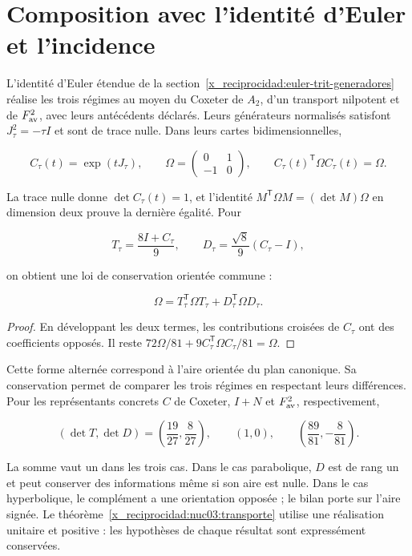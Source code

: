 \section{Composition avec l’identité d’Euler et l’incidence}

L’identité d’Euler étendue de la section~\ref{x_reciprocidad:euler-trit-generadores} réalise les trois régimes au moyen du Coxeter de \(A_2\), d’un transport nilpotent et de \(F_{\rm av}^2\), avec leurs antécédents déclarés. Leurs générateurs normalisés satisfont \(J_\tau^2=-\tau I\) et sont de trace nulle. Dans leurs cartes bidimensionnelles,


\[
C_\tau(t)=\exp(tJ_\tau),\qquad
\Omega=\begin{pmatrix}0&1\\-1&0\end{pmatrix},\qquad
C_\tau(t)^\mathsf T\Omega C_\tau(t)=\Omega.
\]

La trace nulle donne \(\det C_\tau(t)=1\), et l’identité \(M^\mathsf T\Omega M=(\det M)\Omega\) en dimension deux prouve la dernière égalité. Pour

\[
T_\tau=\frac{8I+C_\tau}{9},\qquad
D_\tau=\frac{\sqrt8}{9}(C_\tau-I),
\]

on obtient une loi de conservation orientée commune :

\begin{equation}
\boxed{\Omega=T_\tau^\mathsf T\Omega T_\tau+D_\tau^\mathsf T\Omega D_\tau.}
\label{x_reciprocidad:nuc03:eq:22}
\end{equation}

\begin{proof}
En développant les deux termes, les contributions croisées de \(C_\tau\) ont des coefficients opposés. Il reste \(72\Omega/81+9C_\tau^\mathsf T\Omega C_\tau/81=\Omega\).
\end{proof}

Cette forme alternée correspond à l’aire orientée du plan canonique. Sa conservation permet de comparer les trois régimes en respectant leurs différences. Pour les représentants concrets \(C\) de Coxeter, \(I+N\) et \(F_{\rm av}^2\), respectivement,

\begin{equation}
(\det T,\det D)=
\left(\frac{19}{27},\frac8{27}\right),\qquad
(1,0),\qquad
\left(\frac{89}{81},-\frac8{81}\right).
\label{x_reciprocidad:nuc03:eq:23}
\end{equation}

La somme vaut un dans les trois cas. Dans le cas parabolique, \(D\) est de rang un et peut conserver des informations même si son aire est nulle. Dans le cas hyperbolique, le complément a une orientation opposée ; le bilan porte sur l’aire signée. Le théorème~\ref{x_reciprocidad:nuc03:transporte} utilise une réalisation unitaire et positive : les hypothèses de chaque résultat sont expressément conservées.

